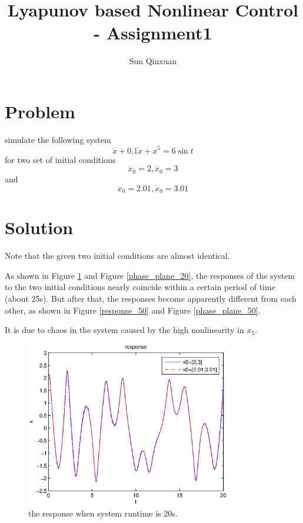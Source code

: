 \documentclass{article}
\title{Lyapunov based Nonlinear Control - Assignment1}
\author{Sun Qinxuan}
\begin{document}
\maketitle

\section{Problem}

\indent simulate the following system
$$
\ddot{x}+0.1\dot{x}+x^5=6\sin{t}
$$
for two set of initial conditions
$$
x_0=2, \dot{x}_0=3
$$
and
$$
x_0=2.01, \dot{x}_0=3.01
$$

\section{Solution}

\indent Note that the given two initial conditions are almost identical.

\indent As shown in Figure \ref{response_20} and Figure \ref{phase_plane_20}, the responses of the system to the two initial conditions nearly coincide within a certain period of time (about 25s). But after that, the responses become apparently different from each other, as shown in Figure \ref{response_50} and Figure \ref{phase_plane_50}.

\indent It is due to chaos in the system caused by the high nonlinearity in $x_5$.

\begin{figure}
  \centering
  \includegraphics[width=0.8\textwidth]{figs/response_20.eps}%
  \caption{the response when system runtime is 20s.}
  \label{response_20}
\end{figure}
\end{document}
